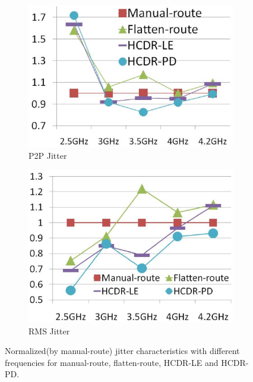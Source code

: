   
    \begin{figure}[ht]
      \centering
      \begin{subfigure}[t]{0.4\textwidth}
        \includegraphics[width=\textwidth]{Fig/Chapter3/P2PJitter.eps}
      \caption{P2P Jitter}\label{P2PJitter}
      \end{subfigure}
      \begin{subfigure}[t]{0.4\textwidth}
        \includegraphics[width=\textwidth]{Fig/Chapter3/RMSJitter.eps}
        \caption{RMS Jitter}\label{RMSJitter}
      \end{subfigure}
      \caption{Normalized(by manual-route) jitter characteristics with different frequencies for manual-route, flatten-route, HCDR-LE and HCDR-PD.}\label{fig:Jitter}
    \end{figure}
    
